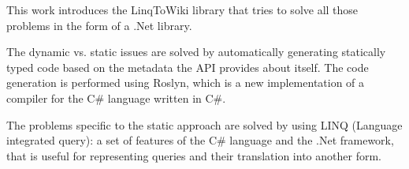 \medskip

This work introduces the LinqToWiki library that tries to solve all those problems
in the form of a .Net library.

The dynamic vs. static issues are solved by automatically generating statically typed
code based on the metadata the API provides about itself.
The code generation is performed using Roslyn,
which is a new implementation of a compiler for the C\# language written in C\#.

The problems specific to the static approach are solved by using LINQ (Language integrated query):
a set of features of the C\# language and the .Net framework,
that is useful for representing queries and their translation into another form.